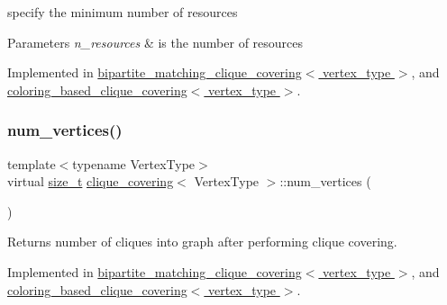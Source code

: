 specify the minimum number of resources 


\begin{DoxyParams}{Parameters}
{\em n\+\_\+resources} & is the number of resources \\
\hline
\end{DoxyParams}


Implemented in \hyperlink{classbipartite__matching__clique__covering_a6a23bb597b452b2a5ba8f7ca07673204}{bipartite\+\_\+matching\+\_\+clique\+\_\+covering$<$ vertex\+\_\+type $>$}, and \hyperlink{classcoloring__based__clique__covering_a3c62b282cc45d953e778193beca5b5d4}{coloring\+\_\+based\+\_\+clique\+\_\+covering$<$ vertex\+\_\+type $>$}.

\mbox{\label{classclique__covering_ad387948a7851179bb056e68c72097008}} 
\subsubsection{\texorpdfstring{num\+\_\+vertices()}{num\_vertices()}}
{\footnotesize\ttfamily template$<$typename Vertex\+Type$>$ \\
virtual \hyperlink{tutorial__fpt__2017_2intro_2sixth_2test_8c_a7c94ea6f8948649f8d181ae55911eeaf}{size\+\_\+t} \hyperlink{classclique__covering}{clique\+\_\+covering}$<$ Vertex\+Type $>$\+::num\+\_\+vertices (\begin{DoxyParamCaption}{ }\end{DoxyParamCaption})\hspace{0.3cm}{\ttfamily [pure virtual]}}



Returns number of cliques into graph after performing clique covering. 



Implemented in \hyperlink{classbipartite__matching__clique__covering_a023f2eea658d97a22e5dbddc89fb1da5}{bipartite\+\_\+matching\+\_\+clique\+\_\+covering$<$ vertex\+\_\+type $>$}, and \hyperlink{classcoloring__based__clique__covering_a269c97e1310e645981964a841f8e5b75}{coloring\+\_\+based\+\_\+clique\+\_\+covering$<$ vertex\+\_\+type $>$}.

\mbox{\label{classclique__covering_a77494360834560870073884abd37883b}} 
